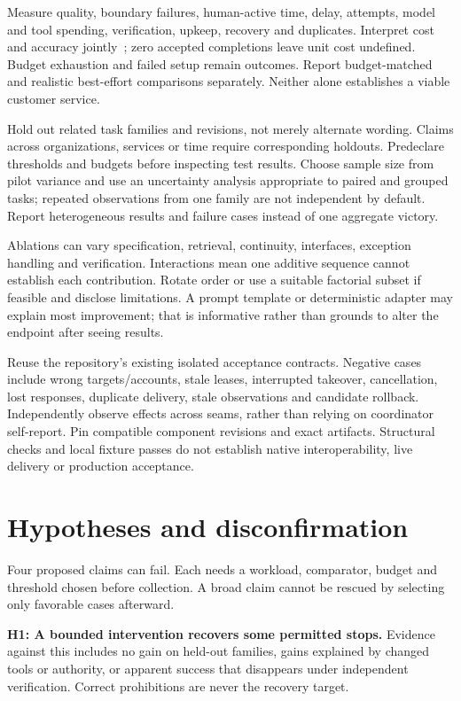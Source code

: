 \documentclass[11pt,letterpaper]{article}
\begin{document}
Measure quality, boundary failures, human-active time, delay, attempts, model and
tool spending, verification, upkeep, recovery and duplicates. Interpret cost and
accuracy jointly~\cite{agentsmatter}; zero accepted completions leave unit cost
undefined. Budget exhaustion and failed setup remain outcomes. Report
budget-matched and realistic best-effort comparisons separately. Neither alone
establishes a viable customer service.

Hold out related task families and revisions, not merely alternate wording. Claims
across organizations, services or time require corresponding holdouts. Predeclare
thresholds and budgets before inspecting test results. Choose sample size from
pilot variance and use an uncertainty analysis appropriate to paired and grouped
tasks; repeated observations from one family are not independent by default.
Report heterogeneous results and failure cases instead of one aggregate victory.

Ablations can vary specification, retrieval, continuity, interfaces, exception
handling and verification. Interactions mean one additive sequence cannot
establish each contribution. Rotate order or use a suitable factorial subset if
feasible and disclose limitations. A prompt template or deterministic adapter may
explain most improvement; that is informative rather than grounds to alter the
endpoint after seeing results.

Reuse the repository's existing isolated acceptance contracts. Negative cases
include wrong targets/accounts, stale leases, interrupted takeover, cancellation,
lost responses, duplicate delivery, stale observations and candidate rollback.
Independently observe effects across seams, rather than relying on coordinator
self-report. Pin compatible component revisions and exact artifacts. Structural
checks and local fixture passes do not establish native interoperability, live
delivery or production acceptance.

\section{Hypotheses and disconfirmation}
\label{sec:hypotheses}
Four proposed claims can fail. Each needs a workload, comparator, budget and
threshold chosen before collection. A broad claim cannot be rescued by selecting
only favorable cases afterward.

\textbf{H1: A bounded intervention recovers some permitted stops.} Evidence
against this includes no gain on held-out families, gains explained by changed
tools or authority, or apparent success that disappears under independent
verification. Correct prohibitions are never the recovery target.
\end{document}
